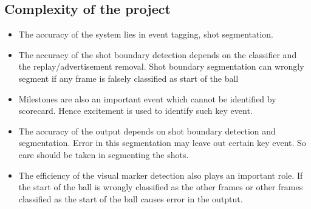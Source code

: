 \subsection{Complexity of the project}
\begin{itemize}
    \item The accuracy of the system lies in event tagging, shot segmentation.
    \item The accuracy of the shot boundary detection depends on the classifier and the replay/advertisement removal. Shot boundary segmentation can wrongly segment if any frame is falsely classified as start of the ball
    \item Milestones are also an important event which cannot be identified by scorecard. Hence excitement is used to identify such key event.
    \item The accuracy of the output depends on shot boundary detection and segmentation. Error in this segmentation may leave out certain key event. So care should be taken in segmenting the shots.
    \item The efficiency of the visual marker detection also plays an important role. If the start of the ball is wrongly classified as the other frames or other frames classified as the start of the ball causes error in the outptut.   
\end{itemize}